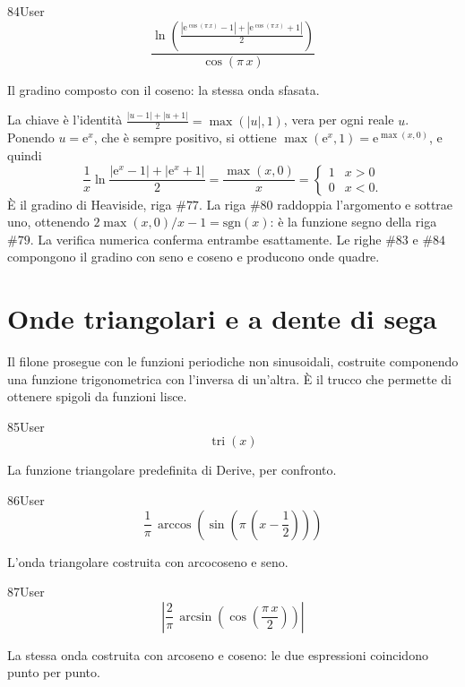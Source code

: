 \begin{espr}{84}{User}{}
\[
\frac{\ln\!\left(\frac{\left|\mathrm{e}^{\cos\!\left(\pi\, x\right)} - 1\right| + \left|\mathrm{e}^{\cos\!\left(\pi\, x\right)} + 1\right|}{2}\right)}{\cos\!\left(\pi\, x\right)}
\]
\end{espr}
Il gradino composto con il coseno: la stessa onda sfasata.


La chiave è l'identità $\frac{|u-1|+|u+1|}{2}=\max(|u|,1)$, vera per ogni reale $u$. Ponendo $u=\mathrm{e}^x$, che è sempre positivo, si ottiene $\max\left(\mathrm{e}^x,1\right)=\mathrm{e}^{\max(x,0)}$, e quindi
\[
  \frac{1}{x}\ln\frac{\left|\mathrm{e}^x-1\right|+\left|\mathrm{e}^x+1\right|}{2}
  =\frac{\max(x,0)}{x}
  =\begin{cases}1 & x>0\\ 0 & x<0.\end{cases}
\]
È il gradino di Heaviside, riga $\#77$. La riga $\#80$ raddoppia l'argomento e sottrae uno, ottenendo $2\max(x,0)/x-1=\mathrm{sgn}(x)$: è la funzione segno della riga $\#79$. La verifica numerica conferma entrambe esattamente. Le righe $\#83$ e $\#84$ compongono il gradino con seno e coseno e producono onde quadre.

\section{Onde triangolari e a dente di sega}

Il filone prosegue con le funzioni periodiche non sinusoidali, costruite componendo una funzione trigonometrica con l'inversa di un'altra. È il trucco che permette di ottenere spigoli da funzioni lisce.

\begin{espr}{85}{User}{}
\[
\operatorname{tri}\!\left(x\right)
\]
\end{espr}
La funzione triangolare predefinita di Derive, per confronto.

\begin{espr}{86}{User}{}
\[
\frac{1}{\pi}\, \arccos\!\left(\sin\!\left(\pi\, \left(x - \frac{1}{2}\right)\right)\right)
\]
\end{espr}
L'onda triangolare costruita con arcocoseno e seno.

\begin{espr}{87}{User}{}
\[
\left|\frac{2}{\pi}\, \arcsin\!\left(\cos\!\left(\frac{\pi\, x}{2}\right)\right)\right|
\]
\end{espr}
La stessa onda costruita con arcoseno e coseno: le due espressioni coincidono punto per punto.

